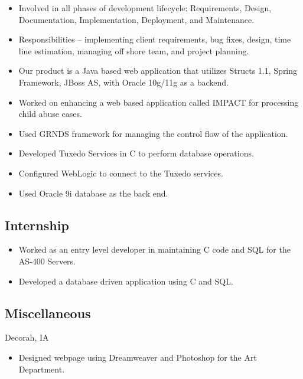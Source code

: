 \documentclass[11pt,letterpaper,sans]{moderncv} %
\begin{document}
     {\begin{itemize}
         \item Involved in all phases of development lifecycle: Requirements, Design, Documentation, Implementation, Deployment, and Maintenance.
         \item Responsibilities -- implementing client requirements, bug fixes, design, time line estimation, managing off shore team, and project planning.
         \item Our product is a Java based web application that utilizes Structs 1.1, Spring Framework, JBoss AS, with Oracle 10g/11g as a backend.
     \end{itemize}}
     
     {\begin{itemize}
         \item Worked on enhancing a web based application called IMPACT for processing child abuse cases.
         \item Used GRNDS framework for managing the control flow of the application.
         \item Developed Tuxedo Services in C to perform database operations.
         \item Configured WebLogic to connect to the Tuxedo services.
         \item Used Oracle 9i database as the back end.
     \end{itemize}}

  \subsection{Internship}
     {\begin{itemize}
         \item Worked as an entry level developer in maintaining C code and SQL for the AS-400 Servers.
         \item Developed a database driven application using C and SQL.
     \end{itemize}}
  
  \subsection{Miscellaneous}
     {Decorah, IA}{}
     {\begin{itemize}
         \item Designed webpage using Dreamweaver and Photoshop for the Art Department.
     \end{itemize}}
\end{document}
